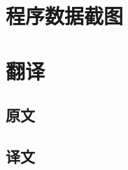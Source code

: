 ﻿%
\appendix
\chapter{程序数据截图}
%
\chapter{翻译}
  \section{原文}
  
%  
%  
%  
%  
  \clearpage
  \section{译文}
  
%  
%  
%  
%  
%  

